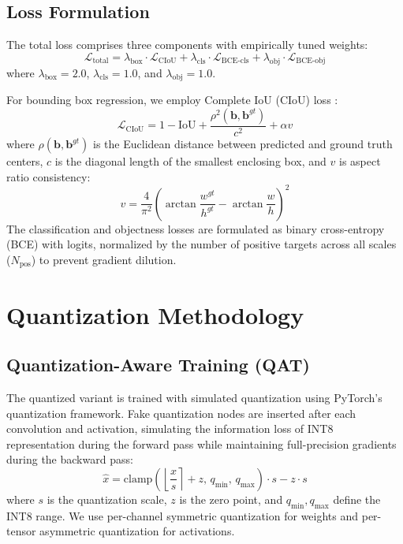 \documentclass[journal]{IEEEtran}
\begin{document}
\subsection{Loss Formulation}
The total loss comprises three components with empirically tuned weights:
\begin{equation}
\mathcal{L}_{\text{total}} = \lambda_{\text{box}} \cdot \mathcal{L}_{\text{CIoU}} + \lambda_{\text{cls}} \cdot \mathcal{L}_{\text{BCE-cls}} + \lambda_{\text{obj}} \cdot \mathcal{L}_{\text{BCE-obj}}
\end{equation}
where $\lambda_{\text{box}} = 2.0$, $\lambda_{\text{cls}} = 1.0$, and $\lambda_{\text{obj}} = 1.0$.

For bounding box regression, we employ Complete IoU (CIoU) loss \cite{zheng2020distance}:
\begin{equation}
\mathcal{L}_{\text{CIoU}} = 1 - \text{IoU} + \frac{\rho^2(\mathbf{b}, \mathbf{b}^{gt})}{c^2} + \alpha v
\end{equation}
where $\rho(\mathbf{b}, \mathbf{b}^{gt})$ is the Euclidean distance between predicted and ground truth centers, $c$ is the diagonal length of the smallest enclosing box, and $v$ is aspect ratio consistency:
\begin{equation}
v = \frac{4}{\pi^2}\left(\arctan\frac{w^{gt}}{h^{gt}} - \arctan\frac{w}{h}\right)^2
\end{equation}
The classification and objectness losses are formulated as binary cross-entropy (BCE) with logits, normalized by the number of positive targets across all scales ($N_{\text{pos}}$) to prevent gradient dilution.

\section{Quantization Methodology}

\subsection{Quantization-Aware Training (QAT)}
The quantized variant is trained with simulated quantization using PyTorch's quantization framework. Fake quantization nodes are inserted after each convolution and activation, simulating the information loss of INT8 representation during the forward pass while maintaining full-precision gradients during the backward pass:
\begin{equation}
\hat{x} = \text{clamp}\left(\left\lfloor \frac{x}{s} \right\rceil + z, \, q_{\min}, \, q_{\max}\right) \cdot s - z \cdot s
\end{equation}
where $s$ is the quantization scale, $z$ is the zero point, and $q_{\min}, q_{\max}$ define the INT8 range. We use per-channel symmetric quantization for weights and per-tensor asymmetric quantization for activations.
\end{document}
